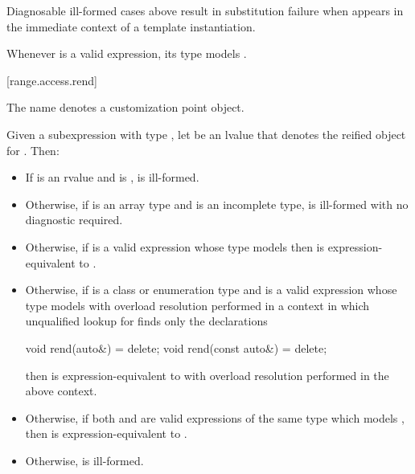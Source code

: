\pnum
\begin{note}
Diagnosable ill-formed cases above result in substitution failure
when 
appears in the immediate context of a template instantiation.
\end{note}

\pnum
\begin{note}
Whenever  is a valid expression, its type models
.
\end{note}

[range.access.rend]{}
%

\pnum
The name  denotes a customization point
object.

\pnum
Given a subexpression  with type ,
let  be an lvalue that denotes the reified object for .
Then:
\begin{itemize}
\item
  If  is an rvalue and
   is ,
   is ill-formed.

\item
  Otherwise, if  is an array type and
   is an incomplete type,
   is ill-formed with no diagnostic required.

\item
  Otherwise, if 
  is a valid expression whose type models
  then  is expression-equivalent to
  .

\item
  Otherwise, if  is a class or enumeration type and
  is a valid expression whose type models
  with overload resolution performed in a context in which
  unqualified lookup for  finds only the declarations
\begin{codeblock}
void rend(auto&) = delete;
void rend(const auto&) = delete;
\end{codeblock}
  then  is expression-equivalent to
  with overload resolution performed in the above context.

\item
  Otherwise, if both  and 
  are valid expressions of the same type which models
  ,
  then  is expression-equivalent to
  .

\item
  Otherwise,  is ill-formed.
\end{itemize}

